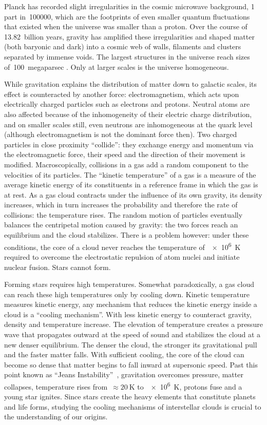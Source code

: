 Planck has recorded slight irregularities in the cosmic microwave background, 1 part in~\num{100000}, which are the footprints of even smaller quantum fluctuations that existed when the universe was smaller than a proton.
Over the course of 13.82~billion years, gravity has amplified these irregularities and shaped matter (both baryonic and dark) into a cosmic web of walls, filaments and clusters separated by immense voids.
The largest structures in the universe reach sizes of~\SI{100}{megaparsec} \parencite{scrimgeour2012wigglez}.
Only at larger scales is the universe homogeneous.

While gravitation explains the distribution of matter down to galactic scales, its effect is counteracted by another force: electromagnetism, which acts upon electrically charged particles such as electrons and protons.
Neutral atoms are also affected because of the inhomogeneity of their electric charge distribution, and on smaller scales still, even neutrons are inhomogeneous at the quark level (although electromagnetism is not the dominant force then).
Two charged particles in close proximity ``collide'': they exchange energy and momentum via the electromagnetic force, their speed and the direction of their movement is modified.
Macroscopically, collisions in a gas add a random component to the velocities of its particles.
The ``kinetic temperature'' of a gas is a measure of the average kinetic energy of its constituents in a reference frame in which the gas is at rest.
As a gas cloud contracts under the influence of its own gravity, its density increases, which in turn increases the probability and therefore the rate of collisions: the temperature rises.
The random motion of particles eventually balances the centripetal motion caused by gravity: the two forces reach an equilibrium and the cloud stabilizes.
There is a problem however: under these conditions, the core of a cloud never reaches the temperature of~\SI{e6}{\kelvin} required to overcome the electrostatic repulsion of atom nuclei and initiate nuclear fusion.
Stars cannot form.

Forming stars requires high temperatures.
Somewhat paradoxically, a gas cloud can reach these high temperatures only by cooling down.
Kinetic temperature measures kinetic energy,
any mechanism that reduces the kinetic energy inside a cloud is a ``cooling mechanism''.
With less kinetic energy to counteract gravity, density and temperature increase.
The elevation of temperature creates a pressure wave that propagates outward at the speed of sound and stabilizes the cloud at a new denser equilibrium.
The denser the cloud, the stronger its gravitational pull and the faster matter falls.
With sufficient cooling, the core of the cloud can become so dense that matter begins to fall inward at supersonic speed.
Past this point known as ``Jeans Instability''~\parencite{jeans1902stability}, gravitation overcomes pressure,
matter collapses, temperature rises from~$\approx\SI{20}{\kelvin}$ to~\SI{e6}{\kelvin}, protons fuse and a young star ignites.
Since stars create the heavy elements that constitute planets and life forms, studying the cooling mechanisms of interstellar clouds is crucial to the understanding of our origins.

